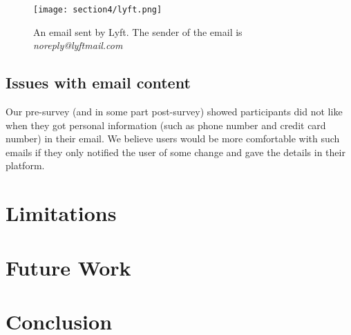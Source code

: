 \begin{figure}
    \centering
    \texttt{[image: section4/lyft.png]}
    \caption{An email sent by Lyft. The sender of the email is \textit{noreply@lyftmail.com}}
    \label{fig:lyft}
\end{figure}

\subsection{Issues with email content}
Our pre-survey (and in some part post-survey) showed participants did not like when they got personal information (such as phone number and credit card number) in their email. We believe users would be more comfortable with such emails if they only notified the user of some change and gave the details in their platform.

\section{Limitations}
\section{Future Work}
\section{Conclusion}